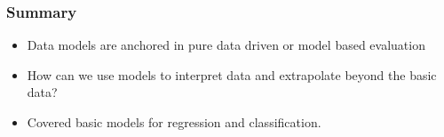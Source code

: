 \documentclass[10pt]{beamer}
\begin{document}
\begin{frame}
  \frametitle{Summary}
  \begin{itemize}
  \item Data models are anchored in pure data driven or model based evaluation
  \item How can we use models to interpret data and extrapolate beyond the basic data?
  \item Covered basic models for regression and classification. 
  \end{itemize}
\end{frame}

% 
\end{document}
